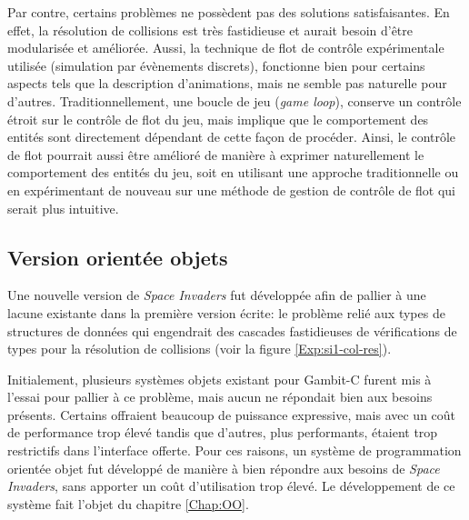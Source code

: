 \documentclass[12pt,twoside,letterpaper,francais]{book}
\begin{document}
Par contre, certains problèmes ne possèdent pas des solutions
satisfaisantes. En effet, la résolution de collisions est très
fastidieuse et aurait besoin d'être modularisée et améliorée. Aussi,
la technique de flot de contrôle expérimentale utilisée (simulation
par évènements discrets), fonctionne bien pour certains aspects tels
que la description d'animations, mais ne semble pas naturelle pour
d'autres. Traditionnellement, une boucle de jeu (\textit{game loop}),
conserve un contrôle étroit sur le contrôle de flot du jeu, mais
implique que le comportement des entités sont directement dépendant de
cette façon de procéder.  Ainsi, le contrôle de flot pourrait aussi
être amélioré de manière à exprimer naturellement le comportement des
entités du jeu, soit en utilisant une approche traditionnelle ou en
expérimentant de nouveau sur une méthode de gestion de contrôle de
flot qui serait plus intuitive.


\FloatBarrier
\subsection{Version orientée objets} \label{Exp:sp2}
Une nouvelle version de \textit{Space Invaders} fut développée afin de
pallier à une lacune existante dans la première version écrite: le
problème relié aux types de structures de données qui engendrait des
cascades fastidieuses de vérifications de types pour la résolution de
collisions (voir la figure \ref{Exp:si1-col-res}).

Initialement, plusieurs systèmes objets existant pour Gambit-C furent
mis à l'essai pour pallier à ce problème, mais aucun ne répondait bien
aux besoins présents. Certains offraient beaucoup de puissance
expressive, mais avec un coût de performance trop élevé tandis que
d'autres, plus performants, étaient trop restrictifs dans l'interface
offerte. Pour ces raisons, un système de programmation orientée objet
fut développé de manière à bien répondre aux besoins de \textit{Space
  Invaders}, sans apporter un coût d'utilisation trop élevé. Le
dévelop\-pement de ce système fait l'objet du chapitre \ref{Chap:OO}.
\end{document}

